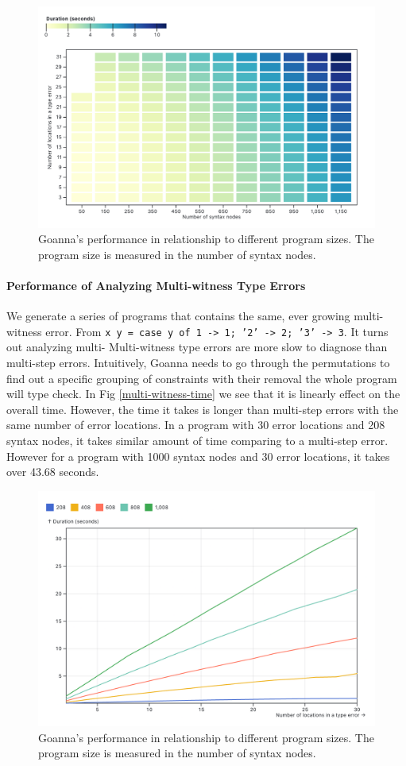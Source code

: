 \documentclass[pdflatex,sn-mathphys-num]{sn-jnl}%
\begin{document}
 \begin{figure}[ht]
        \centering
        \includegraphics[width=0.8\linewidth]{images/multi-step-cell-map.png}
        \caption{Goanna's performance in relationship to different program sizes. The program size is measured in the number of syntax nodes.}
        \label{fig:multi-step-cell}
    \end{figure}

    \paragraph{\textbf{Performance of Analyzing Multi-witness Type Errors}}

    We generate a series of programs that contains the same, ever growing multi-witness error. From \texttt{x y = case y of 1 -> 1; '2' -> 2; '3' -> 3}. 
    It turns out analyzing multi-
    Multi-witness type errors are more slow to diagnose than multi-step errors. Intuitively, Goanna needs to go through the permutations to find out a specific grouping of constraints with their removal the whole program will type check. In Fig \ref{multi-witness-time} we see that it is linearly effect on the overall time. However, the time it takes is longer than multi-step errors with the same number of error locations. In a program with 30 error locations and 208 syntax nodes, it takes similar amount of time comparing to a multi-step error. However for a program with 1000 syntax nodes and 30 error locations, it takes over 43.68 seconds. 
 \begin{figure}[ht]
        \centering
        \includegraphics[width=0.8\linewidth]{images/multi-witness-time.png}
        \caption{Goanna's performance in relationship to different program sizes. The program size is measured in the number of syntax nodes.}
        \label{fig:multi-witness-time}
    \end{figure}
  
\end{document}
